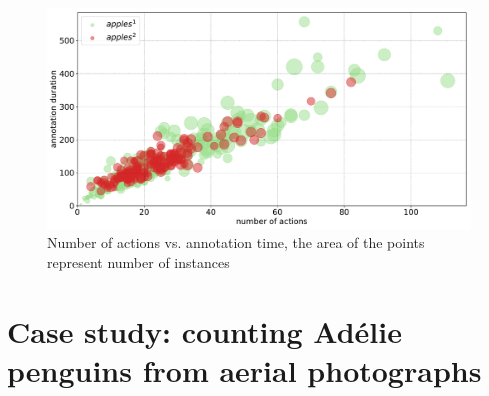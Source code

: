 \begin{figure}[ht]
\centering
\includegraphics[width=1.0\linewidth]{charts/scatters/apples_scatter.pdf}
\caption{ Number of actions vs. annotation time, the area of the points represent number of instances }
\label{fig:apples_actions_time}
\end{figure}



\section{Case study: counting Adélie penguins from aerial photographs}
\label{sec:case_penguins}

